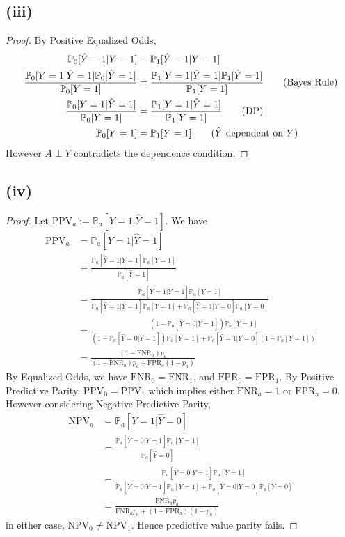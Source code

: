 \documentclass[twoside,11pt]{homework}
\begin{document}
\subsection*{(iii)}
	\begin{proof}
		By Positive Equalized Odds,
		\begin{align*}
			\mathbb{P}_0[ \hat{Y}=1|Y=1] &= \mathbb{P}_1[\hat{Y}=1|Y=1] \\
			\frac{\mathbb{P}_0[Y=1|\hat{Y}=1] \mathbb{P}_0[\hat{Y}=1] }{\mathbb{P}_0[{Y}=1] }
			&= \frac{\mathbb{P}_1[Y=1|\hat{Y}=1] \mathbb{P}_1[\hat{Y}=1] }{ \mathbb{P}_1[{Y}=1] } \tag{Bayes Rule} \\
			\frac{\mathbb{P}_0[Y=1|\hat{Y}=1]}{\mathbb{P}_0[{Y}=1] }
			&= \frac{\mathbb{P}_1[Y=1|\hat{Y}=1]}{ \mathbb{P}_1[{Y}=1] } \tag{DP}\\
			\mathbb{P}_0[Y=1] &= \mathbb{P}_1[Y=1] \tag{$\hat{Y}$ dependent on $Y$}
		\end{align*}
		However $A\perp Y$ contradicts the dependence condition.
	\end{proof}
\subsection*{(iv)}
	\begin{proof}
		Let $\text{PPV}_a := \mathbb{P}_a[Y=1 | \hat{Y}=1]$. We have
		\begin{align*}
			\text{PPV}_a & = \mathbb{P}_a[Y=1 | \hat{Y}=1] \\
			&= \frac{\mathbb{P}_a[\hat{Y}=1|Y=1] \mathbb{P}_a[Y=1] }
			{\mathbb{P}_a[\hat{Y}=1] } \tag{Bayes Rule}\\
			&= \frac{\mathbb{P}_a[\hat{Y}=1|Y=1] \mathbb{P}_a[Y=1] }
			{\mathbb{P}_a[\hat{Y}=1|Y=1] \mathbb{P}_a[Y=1]+
			\mathbb{P}_a[\hat{Y}=1|Y=0] \mathbb{P}_a[Y=0] }\\
			&= \frac{ (1-\mathbb{P}_a[\hat{Y}=0|Y=1]) \mathbb{P}_a[Y=1] }
			{ (1-\mathbb{P}_a[\hat{Y}=0|Y=1])  \mathbb{P}_a[Y=1]+
			\mathbb{P}_a[\hat{Y}=1|Y=0] (1-\mathbb{P}_a[Y=1]) }\\
			&= \frac{(1-\text{FNR}_a) p_a}{(1-\text{FNR}_a)  p_a+\text{FPR}_a(1-p_a)}
		\end{align*}
		By Equalized Odds, we have $\text{FNR}_0=\text{FNR}_1$, and $\text{FPR}_0=\text{FPR}_1$.
		By Positive Predictive Parity, $\text{PPV}_0=\text{PPV}_1$ which implies either $\text{FNR}_a=1$
		or $\text{FPR}_a=0$. However considering Negative Predictive Parity,
		\begin{align*}
			\text{NPV}_a &=  \mathbb{P}_a[Y=1 | \hat{Y}=0] \\
			&= \frac{\mathbb{P}_a[\hat{Y}=0|Y=1] \mathbb{P}_a[Y=1] }
			{\mathbb{P}_a[\hat{Y}=0] } \tag{Bayes Rule}\\
			&= \frac{\mathbb{P}_a[\hat{Y}=0|Y=1] \mathbb{P}_a[Y=1] }
			{\mathbb{P}_a[\hat{Y}=0|Y=1] \mathbb{P}_a[Y=1]+
			\mathbb{P}_a[\hat{Y}=0|Y=0] \mathbb{P}_a[Y=0] }\\
			&= \frac{\text{FNR}_a p_a}{\text{FNR}_a p_a+(1-\text{FPR}_a)(1-p_a)}
		\end{align*}
		in either case, $\text{NPV}_0\neq \text{NPV}_1$. Hence predictive value parity fails.
	\end{proof}
\end{document}
